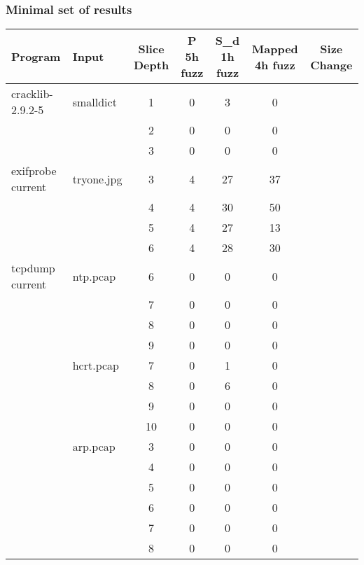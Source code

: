 \documentclass{beamer}
\begin{document}
\frame
{
	\frametitle{Minimal set of results}
	\tiny

	
	\begin{center}
	\begin{tabular}{|l | l | c  | c | c | c| c |}
	\hline
	Program          & Input      & Slice Depth  & P 5h fuzz &  S\_d 1h fuzz & Mapped 4h fuzz & Size Change\\ \hline
	cracklib-2.9.2-5 & smalldict   & 1 & 0 & 3 & 0 & \\
	                 &             & 2 & 0 & 0 & 0 & \\
	                 &             & 3 & 0 & 0 & 0 & \\ \hline
	exifprobe current & tryone.jpg & 3 & 4 & 27 & 37 & \\ 
	                  &            & 4 & 4 & 30 & 50 & \\ 
	                  &            & 5 & 4 & 27 & 13 & \\ 
	                  &            & 6 & 4 & 28 & 30 & \\ \hline
	tcpdump current   & ntp.pcap   & 6 & 0 & 0 & 0  & \\ \
	                  &   & 7 & 0 & 0 & 0  & \\ 
	                  &    & 8 & 0 & 0 & 0  & \\ 
	                  &    & 9 & 0 & 0 & 0  & \\ \cline{2-7}
                      & hcrt.pcap  & 7 & 0 & 1 & 0  & \\
                      &            & 8 & 0 & 6 & 0  & \\ 
                      &            & 9 & 0 & 0 & 0  & \\
                      &            & 10 & 0 & 0 & 0 & \\ \cline{2-7}
                      & arp.pcap   & 3 & 0 & 0 & 0 & \\ 
                      &    & 4 & 0 & 0 & 0 & \\                    
                      &    & 5 & 0 & 0 & 0 & \\ 
                      &    & 6 & 0 & 0 & 0 & \\
                      &    & 7 & 0 & 0 & 0 & \\
                      &    & 8 & 0 & 0 & 0 & \\ \hline                                                                 
	\end{tabular}
	\end{center}

}
\end{document}
